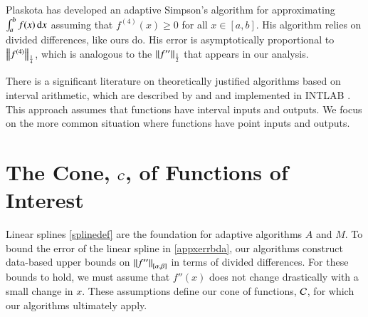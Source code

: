 \documentclass[review]{elsarticle}
\theoremstyle{definition}
\begin{document}
Plaskota \cite{Pla15a} has developed an adaptive Simpson's algorithm for approximating $\int_a^b f(x) \, \dif x$ assuming that $f^{(4)}(x) \ge 0$ for all $x \in [a,b]$.  His algorithm relies on divided differences, like ours do.  His error is asymptotically proportional to $\norm[\frac14]{f^{(4)}}$, which is analogous to the $\norm[\frac12]{f''}$ that appears in our analysis.

There is a significant literature on theoretically justified algorithms based on
interval arithmetic, which are described by \cite{MoKeCl09} and \cite{Rum10a}
and implemented in INTLAB \cite{Rum99a}. This approach assumes that functions
have interval inputs and outputs. We focus on the more common situation where
functions have point inputs and outputs.

\section{The Cone, $\cc$, of Functions of Interest} \label{sec:cone}

Linear splines \eqref{splinedef} are the foundation for adaptive algorithms $A$ and $M$. 
To bound the error of the linear spline in \eqref{appxerrbda}, our algorithms construct
data-based upper bounds on $\norm[{[\alpha, \beta]}]{f''}$ in terms of  divided differences. For
these bounds to hold, we must assume that $f''(x)$ does not change drastically
with a small change in $x$. These assumptions define our cone of functions, $\cc$, for
which our algorithms ultimately apply.
\end{document}
